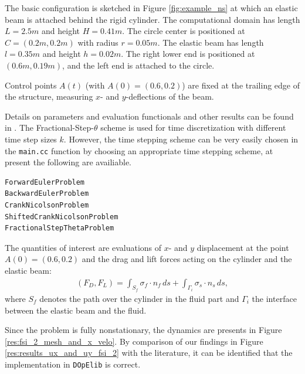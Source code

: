 \documentclass[prodmode,acmtoms]{acmsmall}
\numberwithin{equation}{section}
\newcommand{\dope}{\texttt{DOpElib}}
\begin{document}
The basic configuration is 
sketched in Figure \ref{fig:example_ns} at which an elastic beam is attached 
behind the rigid cylinder. 
The computational domain has length $L=2.5m$ and height $H=0.41m$. The circle center
is positioned at $C=(0.2m,0.2m)$ with radius $r=0.05m$. The elastic beam has length
$l=0.35m$ and height $h=0.02m$. The right lower end is positioned at 
$(0.6m,0.19m)$, and
the left end is attached to the circle. 

%

Control points $A(t)$ (with $A(0) = (0.6,0.2)$) are fixed at the 
trailing edge of the structure, measuring $x$- and $y$-deflections of the beam.

Details 
on parameters and evaluation functionals and other results 
can be found in \cite{HrTu06b,BuSc06,DeHaeAnnBrVie10,Wi11}. 
The Fractional-Step-$\theta$ scheme is used for time discretization with
different time step sizes $k$. However, the time stepping scheme can be 
very easily chosen in the \texttt{main.cc} function by choosing an appropriate 
time stepping scheme, at present the following are availiable.
\begin{lstlisting}
ForwardEulerProblem
BackwardEulerProblem
CrankNicolsonProblem
ShiftedCrankNicolsonProblem
FractionalStepThetaProblem
\end{lstlisting}

The quantities of interest are evaluations of 
$x$- and $y$ displacement at the point $A(0) = (0.6,0.2)$
and the drag and lift forces acting on the cylinder and the elastic beam:
\begin{align}
\label{drag_lift_forces}
(F_D , F_L) 
= {\int_{S_f} \sigma_f \cdot n_f \, ds + 
\int_{\Gamma_i} \sigma_s \cdot n_s \, ds},
\end{align}
where $S_{f}$ denotes the path over the cylinder in the fluid part and
$\Gamma_i$ the interface between the elastic beam and the 
fluid.

Since the problem is fully nonstationary, the 
dynamics are presents in Figure \ref{res:fsi_2_mesh_and_x_velo}. 
By comparison of our findings in Figure \ref{res:results_ux_and_uy_fsi_2}
with the literature, it can be identified that 
the implementation in \dope{} is correct.
\end{document}
